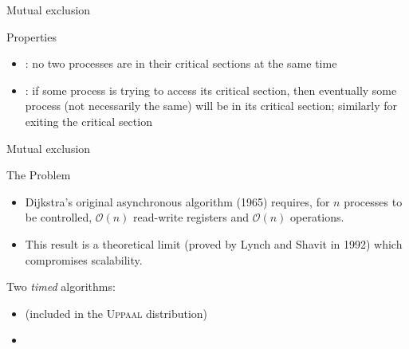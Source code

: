 \documentclass[aspectratio=169]{beamer}
\begin{document}
\begin{slide}{Mutual exclusion}
\small

\begin{block}{Properties}
\begin{itemize}
\item {}: \alert{no two processes are in their critical sections at the same time}
\item {}: \alert{if some process is trying to access its critical section, then 
eventually some process (not necessarily the same) will be in its critical section; similarly for exiting the critical section}
\end{itemize}
\end{block}
\end{slide}

\begin{slide}{Mutual exclusion}
\small


\begin{block}{The Problem}
\begin{itemize}
\item 
Dijkstra's original asynchronous algorithm (1965) requires, for $n$ processes to be controlled,
$\mathcal{O}(n)$ read-write registers and $\mathcal{O}(n)$ operations.
\item
This result is a theoretical limit (proved by Lynch and Shavit in 1992) which compromises scalability.
\end{itemize}
\end{block}
\pause
{}

\begin{block}{Two \emph{timed} algorithms:}
\begin{itemize}
\item  {} (included in the \textsc{Uppaal} distribution)
\item  {}
\end{itemize}
\end{block}
\end{slide}
\end{document}
